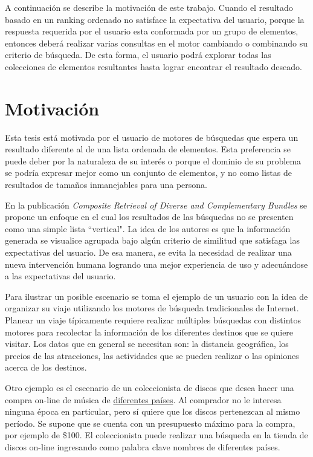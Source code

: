 A continuación se describe la motivación de este trabajo. Cuando el resultado basado en un ranking ordenado no satisface la expectativa del usuario, porque la respuesta requerida por el usuario esta conformada por un grupo de elementos, entonces deberá realizar varias consultas en el motor cambiando o combinando su criterio de búsqueda. De esta forma, el usuario podrá explorar todas las colecciones de elementos resultantes hasta lograr encontrar el resultado deseado.

\section{Motivación}
Esta tesis está motivada por el usuario de motores de búsquedas que espera un resultado diferente al de una lista ordenada de elementos. Esta preferencia se puede deber por la naturaleza de su interés o porque el dominio de su problema se podría expresar mejor como un conjunto de elementos, y no como listas de resultados de tamaños inmanejables para una persona.

En la publicación {\em Composite Retrieval of Diverse and Complementary Bundles} \cite{journals/tkde/Amer-YahiaBCFMZ14} se propone un enfoque en el cual los resultados de las búsquedas no se presenten como una simple lista ``vertical". La idea de los autores es que la información generada se visualice agrupada bajo algún criterio de similitud que satisfaga las expectativas del usuario. De esa manera, se evita la necesidad de realizar una nueva intervención humana logrando una mejor experiencia de uso y adecuándose a las expectativas del usuario.

Para ilustrar un posible escenario se toma el ejemplo de un usuario con la idea de organizar su viaje utilizando los motores de búsqueda tradicionales de Internet. Planear un viaje típicamente requiere realizar múltiples búsquedas con distintos motores para recolectar la información de los diferentes destinos que se quiere visitar. Los datos que en general se necesitan son: la distancia geográfica, los precios de las atracciones, las actividades que se pueden realizar o las opiniones acerca de los destinos.

Otro ejemplo es el escenario de un coleccionista de discos que desea hacer una compra on-line de música de \underline{diferentes países}. Al comprador no le interesa ninguna época en particular, pero sí quiere que los discos pertenezcan al mismo período. Se supone que se cuenta con un presupuesto máximo para la compra, por ejemplo de \$100. El coleccionista puede realizar una búsqueda en la tienda de discos on-line ingresando como palabra clave nombres de diferentes países. 

